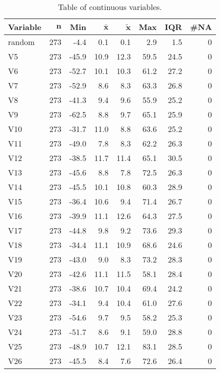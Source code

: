 {\footnotesize
\begin{longtable}{lrrrrrrr}
\caption{Table of continuous variables.} \\ 
 \textbf{Variable} & $\mathbf{n}$ & \textbf{Min} & $\mathbf{\bar{x}}$ & $\mathbf{\widetilde{x}}$ & \textbf{Max} & \textbf{IQR} & \textbf{\#NA} \\ 
  \hline \endhead  \hline
random & 273 &  -4.4 &  0.1 &  0.1 &  2.9 &  1.5 & 0 \\ 
  V5 & 273 & -45.9 & 10.9 & 12.3 & 59.5 & 24.5 & 0 \\ 
  V6 & 273 & -52.7 & 10.1 & 10.3 & 61.2 & 27.2 & 0 \\ 
  V7 & 273 & -52.9 &  8.6 &  8.3 & 63.3 & 26.8 & 0 \\ 
  V8 & 273 & -41.3 &  9.4 &  9.6 & 55.9 & 25.2 & 0 \\ 
  V9 & 273 & -62.5 &  8.8 &  9.7 & 65.1 & 25.9 & 0 \\ 
  V10 & 273 & -31.7 & 11.0 &  8.8 & 63.6 & 25.2 & 0 \\ 
  V11 & 273 & -49.0 &  7.8 &  8.3 & 62.2 & 26.3 & 0 \\ 
  V12 & 273 & -38.5 & 11.7 & 11.4 & 65.1 & 30.5 & 0 \\ 
  V13 & 273 & -45.6 &  8.8 &  7.8 & 72.5 & 26.3 & 0 \\ 
  V14 & 273 & -45.5 & 10.1 & 10.8 & 60.3 & 28.9 & 0 \\ 
  V15 & 273 & -36.4 & 10.6 &  9.4 & 71.4 & 26.7 & 0 \\ 
  V16 & 273 & -39.9 & 11.1 & 12.6 & 64.3 & 27.5 & 0 \\ 
  V17 & 273 & -44.8 &  9.8 &  9.2 & 73.6 & 29.3 & 0 \\ 
  V18 & 273 & -34.4 & 11.1 & 10.9 & 68.6 & 24.6 & 0 \\ 
  V19 & 273 & -43.0 &  9.0 &  8.3 & 73.2 & 28.3 & 0 \\ 
  V20 & 273 & -42.6 & 11.1 & 11.5 & 58.1 & 28.4 & 0 \\ 
  V21 & 273 & -38.6 & 10.7 & 10.4 & 69.4 & 24.2 & 0 \\ 
  V22 & 273 & -34.1 &  9.4 & 10.4 & 61.0 & 27.6 & 0 \\ 
  V23 & 273 & -54.6 &  9.7 &  9.5 & 58.2 & 25.3 & 0 \\ 
  V24 & 273 & -51.7 &  8.6 &  9.1 & 59.0 & 28.8 & 0 \\ 
  V25 & 273 & -48.9 & 10.7 & 12.1 & 83.1 & 28.5 & 0 \\ 
  V26 & 273 & -45.5 &  8.4 &  7.6 & 72.6 & 26.4 & 0 \\ 

\end{longtable}}
